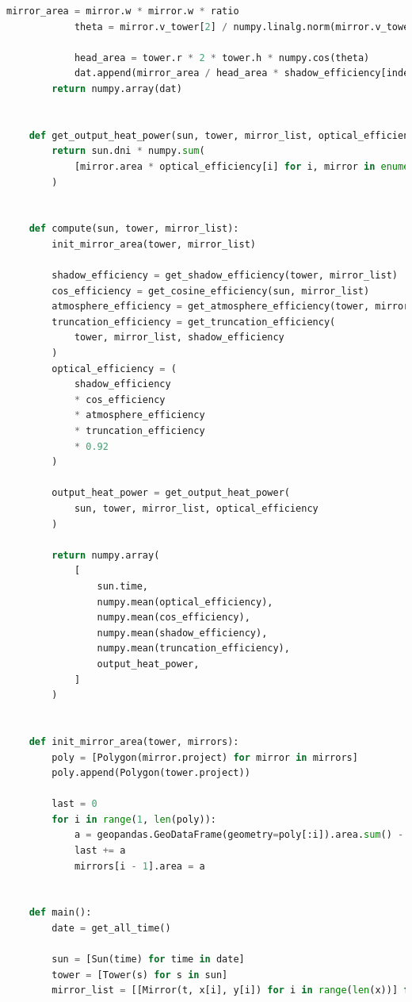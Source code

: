 \documentclass[withoutpreface,bwprint]{cumcmthesis} %
\begin{document}
\begin{appendices}
\begin{lstlisting}[language=python]
            mirror_area = mirror.w * mirror.w * ratio
            theta = mirror.v_tower[2] / numpy.linalg.norm(mirror.v_tower[:2])
    
            head_area = tower.r * 2 * tower.h * numpy.cos(theta)
            dat.append(mirror_area / head_area * shadow_efficiency[index])
        return numpy.array(dat)
    
    
    def get_output_heat_power(sun, tower, mirror_list, optical_efficiency):
        return sun.dni * numpy.sum(
            [mirror.area * optical_efficiency[i] for i, mirror in enumerate(mirror_list)]
        )
    
    
    def compute(sun, tower, mirror_list):
        init_mirror_area(tower, mirror_list)
    
        shadow_efficiency = get_shadow_efficiency(tower, mirror_list)
        cos_efficiency = get_cosine_efficiency(sun, mirror_list)
        atmosphere_efficiency = get_atmosphere_efficiency(tower, mirror_list)
        truncation_efficiency = get_truncation_efficiency(
            tower, mirror_list, shadow_efficiency
        )
        optical_efficiency = (
            shadow_efficiency
            * cos_efficiency
            * atmosphere_efficiency
            * truncation_efficiency
            * 0.92
        )
    
        output_heat_power = get_output_heat_power(
            sun, tower, mirror_list, optical_efficiency
        )
    
        return numpy.array(
            [
                sun.time,
                numpy.mean(optical_efficiency),
                numpy.mean(cos_efficiency),
                numpy.mean(shadow_efficiency),
                numpy.mean(truncation_efficiency),
                output_heat_power,
            ]
        )
    
    
    def init_mirror_area(tower, mirrors):
        poly = [Polygon(mirror.project) for mirror in mirrors]
        poly.append(Polygon(tower.project))
    
        last = 0
        for i in range(1, len(poly)):
            a = geopandas.GeoDataFrame(geometry=poly[:i]).area.sum() - last
            last += a
            mirrors[i - 1].area = a
    
    
    def main():
        date = get_all_time()
    
        sun = [Sun(time) for time in date]
        tower = [Tower(s) for s in sun]
        mirror_list = [[Mirror(t, x[i], y[i]) for i in range(len(x))] for t in tower]
    

\end{lstlisting}
\end{appendices}
\end{document}
